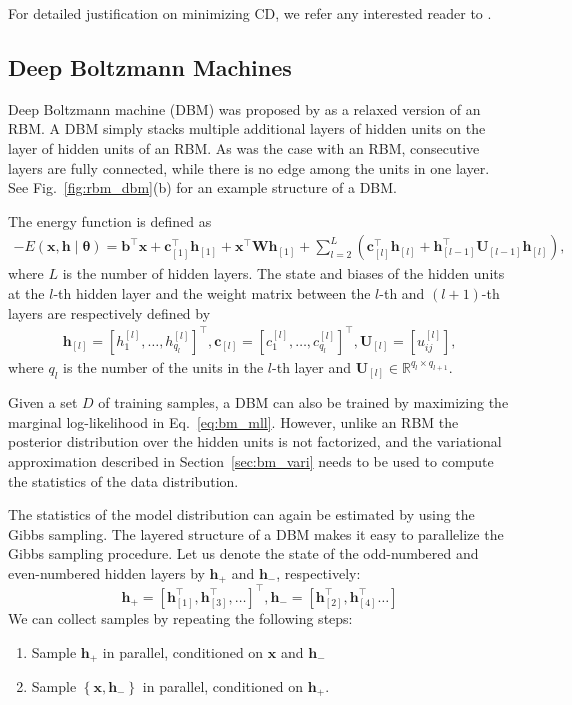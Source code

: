 \documentclass[dissertation,nocontribution,draft*]{aaltoseries}
\newcommand{\qlay}[1]{\left[#1\right]}
\newcommand{\vect}[1]{\mathbf{#1}}
\newcommand{\vects}[1]{\boldsymbol{#1}}
\newcommand{\matr}[1]{\mathbf{#1}}
\newcommand{\vb}[0]{\vect{b}}
\newcommand{\vc}[0]{\vect{c}}
\newcommand{\vh}[0]{\vect{h}}
\newcommand{\vx}[0]{\vect{x}}
\newcommand{\mW}[0]{\matr{W}}
\newcommand{\mU}[0]{\matr{U}}
\newcommand{\TT}[0]{{\vects{\theta}}}
\newcommand{\RR}[0]{\mathbb{R}}
\begin{document}
For detailed justification on minimizing CD, we refer any
interested reader to \citep{Bengio2009}.

\subsection{Deep Boltzmann Machines}
\label{sec:dbm}

Deep Boltzmann machine (DBM) was proposed by
\citet{Salakhutdinov2009a} as a relaxed version of an RBM.  A
DBM simply stacks multiple additional layers of hidden units
on the layer of hidden units of an RBM. As was the case with
an RBM, consecutive layers are fully connected, while there
is no edge among the units in one layer. See
Fig.~\ref{fig:rbm_dbm}(b) for an example structure of a DBM.

The energy function is defined as
\begin{align}
    \label{eq:dbm_energy}
    -E(\vx, \vh \mid \TT) = \vb^\top \vx +
    \vc_{\qlay{1}}^\top \vh_{\qlay{1}}
    + \vx^\top \mW \vh_{\qlay{1}} + \sum_{l=2}^L \left(
    \vc_{\qlay{l}}^\top
    \vh_{\qlay{l}} + \vh_{\qlay{l-1}}^\top \mU_{\qlay{l-1}}
    \vh_{\qlay{l}} \right),
\end{align}
where $L$ is the number of hidden layers. The state and
biases of the hidden units at the $l$-th hidden layer and
the weight matrix between the $l$-th and $(l+1)$-th layers
are respectively defined by
\begin{align*}
    \vh_{\qlay{l}} = \left[ h_{1}^{\qlay{l}}, \dots,
    h_{q_l}^{\qlay{l}} \right]^\top,
    \vc_{\qlay{l}} = \left[ c_{1}^{\qlay{l}}, \dots,
    c_{q_l}^{\qlay{l}} \right]^\top, 
    \mU_{\qlay{l}} = \left[ u_{ij}^{\qlay{l}} \right],
\end{align*}
where $q_l$ is the number of the units in the $l$-th layer
and $\mU_{\qlay{l}} \in \RR^{q_l \times q_{l+1}}$.

Given a set $D$ of training samples, a DBM can also be
trained by maximizing the marginal log-likelihood in
Eq.~\eqref{eq:bm_mll}. However, unlike an RBM the posterior
distribution over the hidden units is not factorized, and
the variational approximation described in
Section~\ref{sec:bm_vari} needs to be used to compute the
statistics of the data distribution. 

The statistics of the model distribution can again be
estimated by using the Gibbs sampling. The layered structure
of a DBM makes it easy to parallelize the Gibbs sampling
procedure. Let us denote the state of the odd-numbered and
even-numbered hidden layers by $\vh_+$ and $\vh_-$,
respectively:
\[
\vh_+=\left[\vh_{\qlay{1}}^\top,
\vh_{\qlay{3}}^\top, \dots \right]^\top, 
    \vh_- = \left[
    \vh_{\qlay{2}}^\top, \vh_{\qlay{4}}^\top \dots \right]
\]
We can collect samples by repeating the following
steps:
\begin{enumerate}
    \itemsep 0em
    \item Sample $\vh_+$ in parallel, conditioned on $\vx$ and $\vh_-$
    \item Sample $\left\{ \vx, \vh_- \right\}$
        in parallel, conditioned on $\vh_+$.
\end{enumerate}
\end{document}
